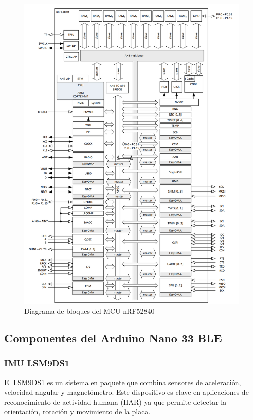 \documentclass[12pt,a4paper]{article}
\begin{document}
\begin{figure}[H]
    \centering
    \includegraphics[width=0.61\linewidth]{Imagenes/bloques.png}
    \caption{Diagrama de bloques del MCU nRF52840 \cite{nRF52840}}
    \label{fig:3}
\end{figure}


\subsection{Componentes del Arduino Nano 33 BLE}

\subsubsection{IMU LSM9DS1}
El LSM9DS1 \cite{imu} es un sistema en paquete que combina sensores de aceleración, velocidad angular y magnetómetro. Este dispositivo es clave en aplicaciones de reconocimiento de actividad humana (HAR) ya que permite detectar la orientación, rotación y movimiento de la placa.
\end{document}
